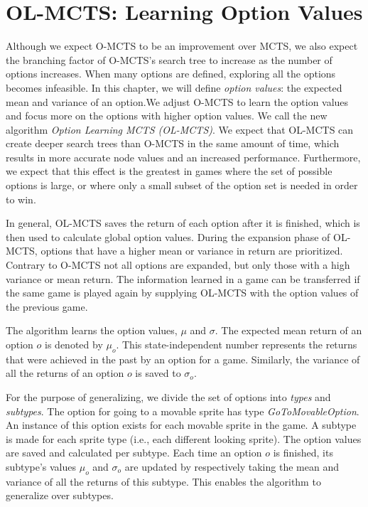 \section{OL-MCTS: Learning Option Values} 
\label{sec:learning} 
Although we expect O-MCTS to be an improvement over MCTS, we also expect the
branching factor of O-MCTS's search tree to increase as the number of options
increases.  When many options are defined, exploring all the options becomes
infeasible. In this chapter, we will define \emph{option values}: the expected
mean and variance of an option.We adjust O-MCTS to learn the option values
and focus more on the options with higher option values. We call the new
algorithm \emph{Option Learning MCTS (OL-MCTS)}. We expect that OL-MCTS can
create deeper search trees than O-MCTS in the same amount of time, which results
in more accurate node values and an increased performance. Furthermore, we
expect that this effect is the greatest in games where the set of possible
options is large, or where only a small subset of the option set is needed in
order to win.

In general, OL-MCTS saves the return of each option after it is finished, which
is then used to calculate global option values. During the expansion phase of
OL-MCTS, options that have a higher mean or variance in return are prioritized.
Contrary to O-MCTS not all options are expanded, but only those with a high
variance or mean return. The information learned in a game can be transferred if
the same game is played again by supplying OL-MCTS with the option values of the
previous game.

The algorithm learns the option values, $\mu$ and $\sigma$. The expected mean
return of an option $o$ is denoted by $\mu_o$. This state-independent number
represents the returns that were achieved in the past by an option for a game.
Similarly, the variance of all the returns of an option $o$ is saved to
$\sigma_o$.

For the purpose of generalizing, we divide the set of options into \emph{types}
and \emph{subtypes}. The option for going to a movable sprite has type
\emph{GoToMovableOption}. An instance of this option exists for each movable
sprite in the game. A subtype is made for each sprite type (i.e., each
different looking sprite). The option values are saved and calculated per
subtype. Each time an option $o$ is finished, its subtype's values $\mu_o$ and
$\sigma_o$ are updated by respectively taking the mean and variance of all the
returns of this subtype. This enables the algorithm to generalize over subtypes.

